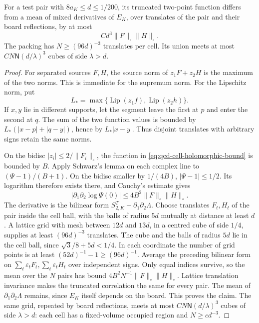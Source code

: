 \documentclass[11pt,letterpaper,reqno]{amsart}
\makeatletter
\theoremstyle{definition}
\newcommand{\ms@minorstart}{%
  \pushQED{\qed}\renewcommand{\qedsymbol}{$\blacksquare$}}
\newenvironment{lemma}[1][]{\ms@minorstart\ms@lemma[#1]}
  {\popQED\endms@lemma}
\theoremstyle{remark}
\makeatother
\begin{document}
\begin{lemma}[Packing with signs]\label{C-408-20}
For a test pair with $8a_K\le d\le1/200$, its truncated two-point function
differs from a mean of mixed derivatives of $E_K$, over translates
of the pair and their board reflections, by at most
\[
 C d^3\|F\|_\circ\|H\|_\circ.
\]
The packing has $N\ge(96d)^{-3}$ translates per cell. Its union
meets at most $C N\mathsf N(d/\lambda)^3$ cubes of side
$\lambda>d$.
\end{lemma}

\begin{proof}
For separated sources $F,H$, the source norm of $z_1F+z_2H$
is the maximum of the two norms. This is immediate for the supremum
norm. For the Lipschitz norm, put
\[
 L_*=\max\{\operatorname{Lip}(z_1f),\operatorname{Lip}(z_2h)\}.
\]
If $x,y$ lie in different supports,
let the segment leave the first at $p$ and enter the second at $q$.
The sum of the two function values is bounded by
$L_*(|x-p|+|q-y|)$, hence by
$L_*|x-y|$. Thus disjoint translates with arbitrary
signs retain the same norms.

On the bidisc $|z_i|\le2/\|F_i\|_\circ$, the function in
\eqref{eq:qcd-cell-holomorphic-bound} is bounded by $B$.
Apply Schwarz's lemma on each complex line to $(\Psi-1)/(B+1)$.
On the bidisc smaller by $1/(4B)$, $|\Psi-1|\le1/2$.
Its logarithm therefore exists there, and Cauchy's estimate gives
\[
 |\partial_1\partial_2\log\Psi(0)|
                  \le4B^2\|F\|_\circ\|H\|_\circ.
\]
The derivative is the bilinear form $S^T_{2,K}-\partial_1\partial_2\Lambda$.
Choose translates $F_t,H_t$ of the pair inside the cell ball,
with the balls of radius $5d$ mutually at distance at least $d$.
A lattice grid with mesh between $12d$ and $13d$, in a centred
cube of side $1/4$, supplies at least $(96d)^{-3}$ translates.
The cube and the balls of radius $5d$ lie in the cell ball, since
$\sqrt3/8+5d<1/4$. In each coordinate the number of grid points
is at least $(52d)^{-1}-1\ge(96d)^{-1}$.
Average the preceding bilinear form on
$\sum_t\varepsilon_tF_t,\sum_t\varepsilon_tH_t$ over independent
signs. Only equal indices survive, so the mean over the $N$ pairs
has bound $4B^2N^{-1}\|F\|_\circ\|H\|_\circ$.
Lattice translation invariance makes the truncated correlation the
same for every pair. The mean of $\partial_1\partial_2\Lambda$
remains, since $E_K$ itself depends on the board. This proves the
claim. The same grid, repeated by board reflections, meets at most
$C N\mathsf N(d/\lambda)^3$ cubes of side $\lambda>d$:
each cell has a fixed-volume occupied region and $N\ge c d^{-3}$.
\end{proof}
\end{document}
